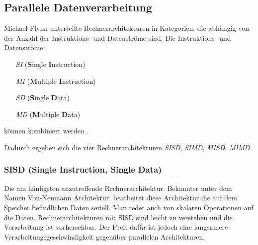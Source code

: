 \subsection{Parallele Datenverarbeitung}
\label{subsec:flynn}
Michael Flynn unterteilte Rechnerarchitekturen in Kategorien, die abhängig von der Anzahl der Instruktions- und Datenströme sind. \newline
Die Instruktions- und Datenströme:
\begin{enumerate}
\item[\textit{SI}] (\textbf{S}ingle \textbf{I}nstruction)
\item[\textit{MI}] (\textbf{M}ultiple \textbf{I}nstruction) 
\item[\textit{SD}] (\textbf{S}ingle \textbf{D}ata) 
\item[\textit{MD}] (\textbf{M}ultiple \textbf{D}ata) 
\end{enumerate}
können kombiniert werden \cite{Flynn1996}. \newline

Dadurch ergeben sich die vier Rechnerarchitekturen \textit{SISD}, \textit{SIMD}, \textit{MISD}, \textit{MIMD}.
\subsubsection*{SISD (Single Instruction, Single Data)}
Die am häufigsten anzutreffende Rechnerarchitektur.
Bekannter unter dem Namen Von-Neumann Architektur, bearbeitet diese Architektur die auf dem Speicher befindlichen Daten seriell.
Man redet auch von skalaren Operationen auf die Daten.
Rechnerarchitekturen mit SISD sind leicht zu verstehen und die Verarbeitung ist vorhersehbar.
Der Preis dafür ist jedoch eine langsamere Verarbeitungsgeschwindigkeit gegenüber parallelen Architekturen.
